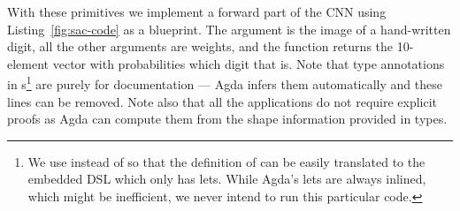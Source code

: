 With these primitives we implement a forward part of the CNN using
Listing~\ref{fig:sac-code} as a blueprint.
The  argument is the image of a hand-written digit, all
the other arguments are weights, and the function returns the 10-element vector
with probabilities which digit that is. Note that type annotations in 
s\footnote{
We use  instead of  so that the definition of 
can be easily translated to the embedded DSL which only has lets.  While Agda's
lets are always inlined, which might be inefficient, we never intend to
run this particular code.
}
are purely for documentation --- Agda infers them automatically and these lines
can be removed.  Note also that all the  applications do not require
explicit proofs as Agda can compute them from the shape information provided
in types. 
